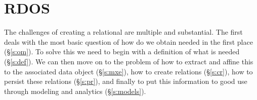 \section{RDOS} \label{s:rdos}
The challenges of creating a relational \os{} are multiple and substantial. The first deals with the most basic question of how do we obtain needed \md{} in the first place (\S\ref{s:om}). To solve this we need to begin with a definition of what is needed (\S\ref{s:def}). We can then move on to the problem of how to extract and affine this \md{} to the associated data object (\S\ref{s:mxe}), how to create relations (\S\ref{s:cr}), how to persist these relations (\S\ref{s:pr}), and finally to put this information to good use through modeling and analytics (\S\ref{s:models}).









